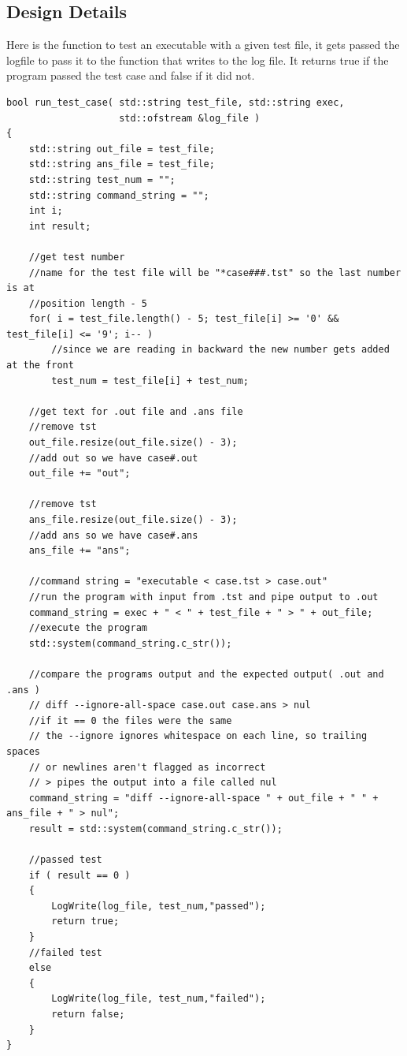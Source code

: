 \subsection{Design Details}
Here is the function to test an executable with a given test file, it gets passed the logfile to pass it to the function
that writes to the log file.  It returns true if the program passed the test case and false if it did not.
\begin{lstlisting}
bool run_test_case( std::string test_file, std::string exec,
                    std::ofstream &log_file )
{
    std::string out_file = test_file;
    std::string ans_file = test_file;
    std::string test_num = "";
    std::string command_string = "";
    int i;
    int result;

    //get test number
    //name for the test file will be "*case###.tst" so the last number is at
    //position length - 5
    for( i = test_file.length() - 5; test_file[i] >= '0' && test_file[i] <= '9'; i-- )
        //since we are reading in backward the new number gets added at the front
        test_num = test_file[i] + test_num;

    //get text for .out file and .ans file
    //remove tst
    out_file.resize(out_file.size() - 3);
    //add out so we have case#.out
    out_file += "out";

    //remove tst
    ans_file.resize(out_file.size() - 3);
    //add ans so we have case#.ans
    ans_file += "ans";

    //command string = "executable < case.tst > case.out"
    //run the program with input from .tst and pipe output to .out
    command_string = exec + " < " + test_file + " > " + out_file;
    //execute the program
    std::system(command_string.c_str());

    //compare the programs output and the expected output( .out and .ans )
    // diff --ignore-all-space case.out case.ans > nul
    //if it == 0 the files were the same
    // the --ignore ignores whitespace on each line, so trailing spaces
    // or newlines aren't flagged as incorrect
    // > pipes the output into a file called nul
    command_string = "diff --ignore-all-space " + out_file + " " + ans_file + " > nul";
    result = std::system(command_string.c_str());

    //passed test
    if ( result == 0 )
    {
        LogWrite(log_file, test_num,"passed");
        return true;
    }
    //failed test
    else
    {
        LogWrite(log_file, test_num,"failed");
        return false;
    }
}
\end{lstlisting}

